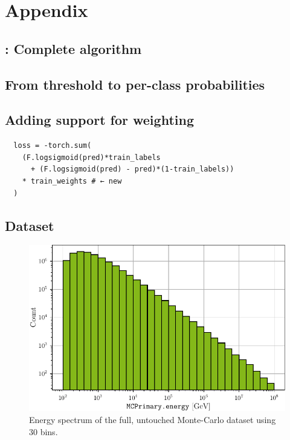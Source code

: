 \chapter{Appendix}
\blindtext

\section{\dseaplus: Complete algorithm} \label{sec:alg:dseaplus}



\section{From threshold to per-class probabilities}
\label{sec:appendix:corn_probas}
\blindtext


\section{Adding support for weighting}
\label{sec:appendix:corn_weighting}
\begin{verbatim}
  loss = -torch.sum(
    (F.logsigmoid(pred)*train_labels
      + (F.logsigmoid(pred) - pred)*(1-train_labels))
    * train_weights # ← new
  )
\end{verbatim}


\section{Dataset}
\begin{figure}
  \centering
  \includegraphics[scale=1]{content/plots/dataset:raw:histogram_full.pdf}
  \caption{Energy spectrum of the full, untouched Monte-Carlo dataset using 30 bins.}
  \label{fig:dataset:raw:histogram}
\end{figure}

